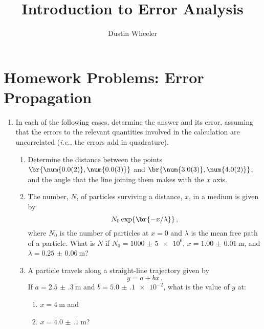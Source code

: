 \documentclass[nobib,nofonts,nols,nohyper]{tufte-handout}
\title{Introduction to Error Analysis}
\author{Dustin Wheeler}
\begin{document}
\maketitle

\section{Homework Problems: Error Propagation} %
\label{sec:homework_problems_error_propagation}

\begin{enumerate}
	\item In each of the following cases, determine the answer and its error, assuming that the errors to the relevant quantities involved in the calculation are uncorrelated (\emph{i.e.,} the errors add in quadrature).
	\begin{enumerate}
		\item Determine the distance between the points \( \br{\num{0.0(2)}, \num{0.0(3)}} \) and \( \br{\num{3.0(3)}, \num{4.0(2)}} \), and the angle that the line joining them makes with the \( x \) axis. 
		\item The number, \( N \), of particles surviving a distance, \( x \), in a medium is given by \[ 
		N_0 \exp\br{-x/\lambda} \, ,
		\] 
		where \( N_0 \) is the number of particles at \( x = 0 \) and \( \lambda \) is the mean free path of a particle. 
		What is \( N \) if \( N_0=\num{1000(5)e6} \), \( x = \SI{1.00(1)}{\m} \), and \( \lambda = \SI{0.25(6)}{\m} \)?
		
		\item A particle travels along a straight-line trajectory given by \[
		 y = a + bx \, .
		 \] 
		If \( a = \SI{2.5(3)}{\m} \) and \( b = \num{5.0(1)e-2} \), what is the value of \( y \) at:
		\begin{enumerate}
			\item \( x = \SI{4}{\m} \) and
			
			\item \( x = \SI{4.0(1)}{\m} \)?
		\end{enumerate}
		
	\end{enumerate}
	

\end{enumerate}
\end{document}
